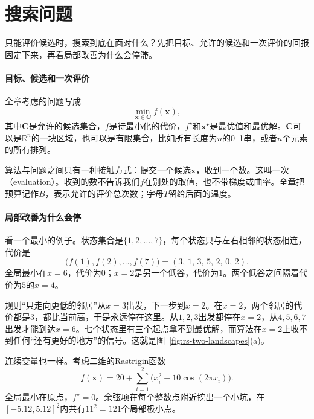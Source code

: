\section{搜索问题}
\label{sec:rs-problem}

只能评价候选时，搜索到底在面对什么？先把目标、允许的候选和一次评价的回报固定下来，再看局部改善为什么会停滞。

\paragraph{目标、候选和一次评价}
全章考虑的问题写成
\begin{equation}
 \min_{\bm{x}\in\bm{C}}f(\bm{x}),
 \label{eq:rs-problem}
\end{equation}
其中$\bm{C}$是允许的候选集合，$f$是待最小化的代价，$f^\star$和$\bm{x}^\star$是最优值和最优解。$\bm{C}$可以是$\mathbb{R}^n$的一块区域，也可以是有限集合，比如所有长度为$n$的0--1串，或者$n$个元素的所有排列。

算法与问题之间只有一种接触方式：提交一个候选$\bm{x}$，收到一个数。这叫一次（evaluation）。收到的数不告诉我们$f$在别处的取值，也不带梯度或曲率。全章把预算记作$B$，表示允许的评价总次数；字母$T$留给后面的温度。

\paragraph{局部改善为什么会停}
看一个最小的例子。状态集合是$\{1,2,\ldots,7\}$，每个状态只与左右相邻的状态相连，代价是
\begin{equation}
 \bigl(f(1),f(2),\ldots,f(7)\bigr)=(3,\,1,\,3,\,5,\,2,\,0,\,2).
 \label{eq:rs-double-valley}
\end{equation}
全局最小在$x=6$，代价为$0$；$x=2$是另一个低谷，代价为$1$。两个低谷之间隔着代价为$5$的$x=4$。

规则“只走向更低的邻居”从$x=3$出发，下一步到$x=2$。在$x=2$，两个邻居的代价都是$3$，都比当前高，于是永远停在这里。从$1,2,3$出发都停在$x=2$，从$4,5,6,7$出发才能到达$x=6$。七个状态里有三个起点拿不到最优解，而算法在$x=2$上收不到任何“还有更好的地方”的信号。这就是图~\ref{fig:rs-two-landscapes}(a)。

连续变量也一样。考虑二维的Rastrigin函数
\begin{equation}
 f(\bm{x})=20+\sum_{i=1}^{2}\bigl(x_i^2-10\cos(2\pi x_i)\bigr).
 \label{eq:rs-rastrigin}
\end{equation}
全局最小在原点，$f^\star=0$。余弦项在每个整数点附近挖出一个小坑，在$[-5.12,5.12]^2$内共有$11^2=121$个局部极小点。

